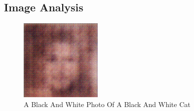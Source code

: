 \documentclass{article}%
\begin{document}
%
\subsection{Image Analysis}%
\label{subsec:ImageAnalysis}%


\begin{figure}[h!]%
\centering%
\includegraphics[width=150px]{500_fake_images/samples_5_287.png}%
\caption{A Black And White Photo Of A Black And White Cat}%
\end{figure}

%
\end{document}
